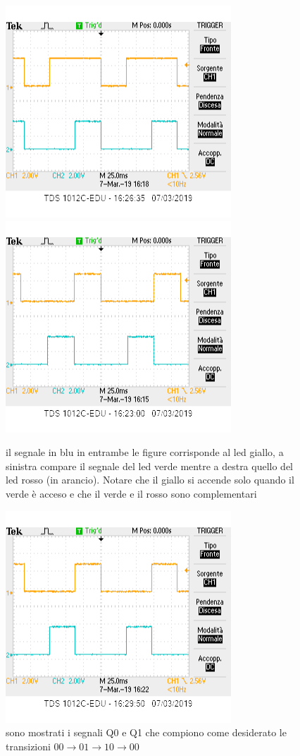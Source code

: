 \documentclass[10pt,a4paper]{article}
\begin{document}
\begin{figure}
	\centering
	\includegraphics[scale=0.8]{yellowandgreen.png}
	\includegraphics[scale=0.8]{yellowandred.png}
	
	\caption{il segnale in blu in entrambe le figure corrisponde al led giallo, a sinistra compare il segnale del led verde mentre a destra quello del led rosso (in arancio). Notare che il giallo si accende solo quando il verde è  acceso e che il verde e il rosso sono complementari}
	
\end{figure}
\begin{figure}
\centering

\includegraphics[scale=0.8]{Q1andQ2}
\caption{sono mostrati i segnali Q0 e Q1 che compiono come desiderato le transizioni $00\to 01 \to 10 \to 00$}
\end{figure}
\end{document}
